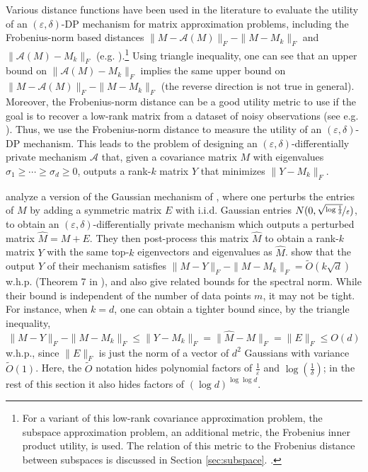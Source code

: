 \documentclass[11pt,letterpaper]{article}
\renewcommand{\epsilon}{\varepsilon}
\newcommand{\nfrac}{\nicefrac}
\newcommand{\eps}{\varepsilon}
\begin{document}
Various distance functions have been used in the literature to evaluate the utility of an $(\eps,\delta)$-DP mechanism for matrix approximation problems, including the Frobenius-norm based distances $\|M-\mathcal{A}(M)\|_F - \|M-M_k\|_F$ and 
$\|\mathcal{A}(M) -M_k\|_F$  (e.g. \cite{dwork2014analyze, amin2019differentially}).\footnote{For a variant of this low-rank covariance approximation problem, the subspace approximation problem, an additional metric, the Frobenius inner product utility, is used. The relation of this metric to the Frobenius distance between subspaces is discussed in Section \ref{sec:subspace}.
.}
Using triangle inequality, one can see that an upper bound on $\|\mathcal{A}(M)- M_k\|_F$ implies the same upper bound on  $\|M-\mathcal{A}(M)\|_F - \|M-M_k\|_F$ (the reverse direction is not true in general).
%
Moreover, the Frobenius-norm distance can be a good utility metric to use if the goal is to recover a low-rank matrix from a dataset of noisy observations (see e.g. \cite{davenport2016overview}). 
%
Thus, we use the Frobenius-norm distance to measure the utility of an $(\eps,\delta)$-DP mechanism.
%
This leads to the problem of designing an $(\eps,\delta)$-differentially private mechanism $\mathcal{A}$ that, given a covariance matrix $M$ with eigenvalues $\sigma_1 \geq \cdots \geq \sigma_d \geq 0$, outputs a rank-$k$ matrix $Y$ that minimizes $\| Y - M_k\|_F$.


\cite{dwork2014analyze} analyze a version of the Gaussian mechanism of \cite{dwork2006our}, where one perturbs the entries of $M$ by adding a symmetric matrix $E$ with i.i.d. Gaussian entries $N(0,\nfrac{\sqrt{\log\frac{1}{\delta}}}{\eps})$, to obtain an $(\eps, \delta)$-differentially private mechanism which outputs a perturbed matrix $\hat{M} = M+E$.
%
They then post-process this matrix $\hat{M}$ to obtain a rank-$k$ matrix $Y$ with the same top-$k$ eigenvectors and eigenvalues as $\hat{M}$.
%
\cite{dwork2014analyze} show that the output $Y$ of their mechanism satisfies  $\| M-Y\|_F - \|M-M_k\|_F = \tilde{O}(k\sqrt{d})$ w.h.p. (Theorem 7 in \cite{dwork2014analyze}), and also give related bounds for the spectral norm.
%
While their bound is independent of the number of data points $m$, it may not be tight.
%
For instance, when $k=d$, one can obtain a tighter bound since, by the triangle inequality, $$\|M-Y\|_F - \|M-M_k\|_F \leq \|Y- M_k\|_F = \|\hat{M}- M\|_F = \|E\|_F \leq O(d)$$ w.h.p., since $\|E\|_F$ is just the norm of a vector of $d^2$ Gaussians with variance $\tilde{O}(1)$.
%
  Here, the $\tilde{O}$ notation hides polynomial factors of  $\frac{1}{\epsilon}$ and $\log(\frac{1}{\delta})$; in the rest of this section it also hides factors of $(\log d)^{\log \log d}$.
\color{black}
\end{document}
